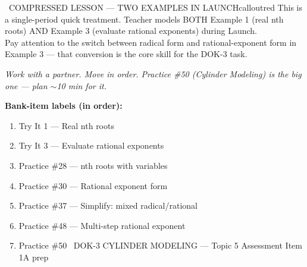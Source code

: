 \documentclass[11pt]{article}
\begin{document}
\begin{callout}{\IconWarn\ COMPRESSED LESSON --- TWO EXAMPLES IN LAUNCH}{calloutred}
This is a single-period quick treatment. Teacher models BOTH Example 1 (real nth roots) AND Example 3 (evaluate rational exponents) during Launch.\\
Pay attention to the switch between radical form and rational-exponent form in Example 3 --- that conversion is the core skill for the DOK-3 task.
\end{callout}

\textit{Work with a partner. Move in order. Practice \#50 (Cylinder Modeling) is the big one --- plan \(\sim\)10 min for it.}

\textbf{Bank-item labels (in order):}
\begin{enumerate}[leftmargin=1.6em,itemsep=2pt,topsep=2pt]
  \item Try It 1 --- Real nth roots
  \item Try It 3 --- Evaluate rational exponents
  \item Practice \#28 --- nth roots with variables
  \item Practice \#30 --- Rational exponent form
  \item Practice \#37 --- Simplify: mixed radical/rational
  \item Practice \#48 --- Multi-step rational exponent
  \item Practice \#50 \IconStar\ DOK-3 CYLINDER MODELING --- Topic 5 Assessment Item 1A prep
\end{enumerate}


\end{document}
